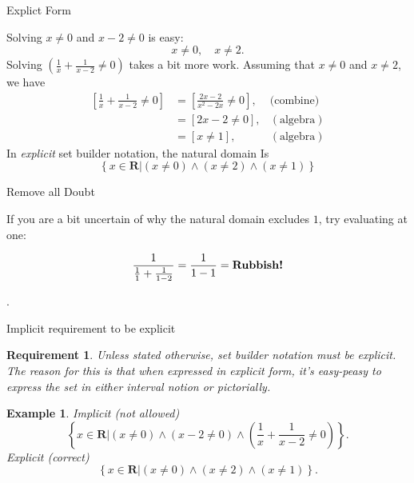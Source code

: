 \documentclass[usenames,dvipsnames,fleqn,leqno,10pt, pdflatex]{beamer}
\newcommand{\reals}{\mathbf{R}}
\newtheorem{require}{Requirement}
\newtheorem{myexample}{Example}
\begin{document}
\begin{frame}{Explict Form}

Solving $ x \neq 0$ and $x-2 \neq 0$ is easy:
\[ 
    x \neq 0, \quad x \neq 2.
\]
Solving \(\left(\frac{1}{x} + \frac{1}{x-2} \neq 0 \right) \) takes
a bit more work. Assuming that $x \neq 0$ and $x \neq 2$, we have
\begin{align*}
    \left[\frac{1}{x} + \frac{1}{x-2} \neq 0 \right] 
       &= \left[\frac{2 x-2}{{{x}^{2}}-2 x} \neq 0 \right],  &\mbox{(combine)}\\
       &= \left[2 x-2 \neq 0 \right], &(\mbox{algebra}) \\
       &=  \left[x  \neq 1 \right], &(\mbox{algebra})
\end{align*}
In \emph{explicit} set builder notation, the natural domain Is\
\begin{equation*}
    \left\{ x \in \reals \bigg | \left(x \neq 0\right)  
    \land \left(x  \neq 2 \right) \land  
    \left(x \neq 1 \right) \right\}
\end{equation*}
\end{frame}

\begin{frame}{Remove all Doubt}

If you are a bit uncertain of why the natural domain excludes $1$,
try evaluating at one:

\begin{equation*}
    \frac{1}{\frac{1}{1} + \frac{1}{1-2}} = \frac{1}{1 - 1} =
    \mbox{\textbf{Rubbish!}}
\end{equation*}

\vfill.
\end{frame}


\begin{frame}{Implicit requirement to be explicit}

    \begin{require} Unless stated otherwise, set builder notation
        must be explicit. The reason for this is that when expressed
        in explicit form, it's easy-peasy to express the set in either
        interval notion or pictorially.
    \end{require}
    
    \begin{myexample} Implicit (not allowed)
        \begin{equation*}
            \left\{ x \in \reals \bigg | \left(x \neq 0 \right)  
            \land \left(x-2 \neq 0 \right) \land  
            \left(\frac{1}{x} + \frac{1}{x-2} \neq 0 \right) \right\}.
        \end{equation*}
    Explicit (correct)
    \begin{equation*}
        \left\{ x \in \reals \bigg | \left(x \neq 0\right)  
        \land \left(x  \neq 2 \right) \land  
        \left(x \neq 1 \right) \right\}.
    \end{equation*}
    \end{myexample}
    
        
    \end{frame}
 
\end{document}
